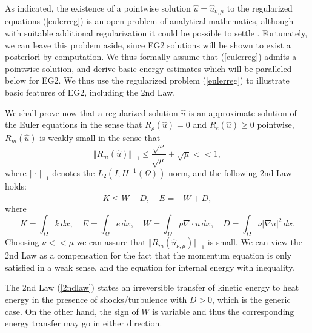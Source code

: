 As indicated, the existence of a pointwise solution
$\hat u=\hat u_{\nu ,\mu}$ to the regularized equations (\ref{eulerreg})
is an open problem of analytical mathematics,
although with suitable additional regularization it could
be possible to settle \cite{feireisl}. Fortunately, we can leave this
problem aside, since EG2 solutions will be shown to exist a posteriori
by computation. We thus formally assume that (\ref{eulerreg}) admits a
pointwise solution, and derive basic energy estimates which
will be paralleled below for EG2.  We thus use the regularized problem
(\ref{eulerreg}) to illustrate basic features of EG2, including
the 2nd Law.


We shall prove now that a regularized solution
$\hat u$ is an approximate solution of the Euler equations
in the sense that $R_\rho (\hat u)=0$ and $R_e(\hat u)\ge 0$ pointwise,
$R_m(\hat u)$ is weakly small in the sense that
\begin{equation}\label{euler1dweak}
\Vert R_m(\hat u)\Vert_{-1}\le
\frac{\sqrt{\nu}}{\sqrt{\mu}}+\sqrt{\mu}<<1,
\end{equation}
where $\Vert\cdot\Vert_{-1}$ denotes the $L_2(I;H^{-1}(\Omega ))$-norm,
and the following 2nd Law holds:
\begin{equation}\label{2ndlaw}
\dot K \le W-D,\quad \dot E =-W+D,
\end{equation}
where
\[
K=\int_\Omega k\, dx,\quad E=\int_\Omega e\, dx, \quad W
=\int_\Omega p\nabla\cdot u\, dx,
\quad D =\int_\Omega \nu \vert\nabla u\vert^2\, dx.
\]
Choosing $\nu << \mu$ we can assure that
$\Vert R_m(\hat u_{\nu ,\mu})\Vert_{-1}$ is small. We can view
the 2nd Law as a compensation for the fact that the momentum
equation is only satisfied in a weak sense, and the equation
for internal energy with inequality.

The 2nd Law (\ref{2ndlaw}) states an irreversible
transfer of kinetic energy to heat energy in the presence of
shocks/turbulence with $D >0$, which is the generic case.
On the other hand, the sign of $W$ is variable and
thus the corresponding energy transfer may go in either direction.

